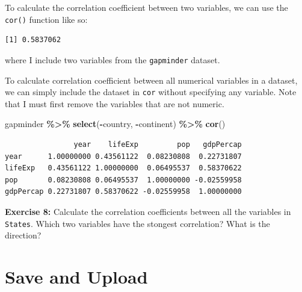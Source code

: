 \documentclass[
]{book}
\makeatletter
\newenvironment{Shaded}{\begin{snugshade}}{\end{snugshade}}
\newcommand{\FunctionTok}[1]{\textcolor[rgb]{0.27,0.27,0.27}{\textbf{#1}}}
\newcommand{\NormalTok}[1]{#1}
\newcommand{\SpecialCharTok}[1]{\textcolor[rgb]{0.43,0.43,0.43}{\textbf{#1}}}
\newenvironment{kframe}{%
\medskip{}
\setlength{\fboxsep}{.8em}
 \def\at@end@of@kframe{}%
 \ifinner\ifhmode%
  \def\at@end@of@kframe{\end{minipage}}%
  \begin{minipage}{\columnwidth}%
 \fi\fi%
 \def\FrameCommand##1{\hskip\@totalleftmargin \hskip-\fboxsep
 \colorbox{shadecolor}{##1}\hskip-\fboxsep
     \hskip-\linewidth \hskip-\@totalleftmargin \hskip\columnwidth}%
 \MakeFramed {\advance\hsize-\width
   \@totalleftmargin\z@ \linewidth\hsize
   \@setminipage}}%
 {\par\unskip\endMakeFramed%
 \at@end@of@kframe}
\renewenvironment{Shaded}{\begin{kframe}}{\end{kframe}}
\newenvironment{rmdblock}[1]
  {\begin{shaded*}
  }
  {\end{shaded*}
  }
\newenvironment{learncheck}
  {\begin{rmdblock}{warning}}
  {\end{rmdblock}}
\makeatother
\begin{document}
To calculate the correlation coefficient between two variables, we can use the \texttt{cor()} function like so:

\begin{Shaded}
\end{Shaded}

\begin{verbatim}
[1] 0.5837062
\end{verbatim}

where I include two variables from the \texttt{gapminder} dataset.

To calculate correlation coefficient between all numerical variables in a dataset, we can simply include the dataset in \texttt{cor} without specifying any variable. Note that I must first remove the variables that are not numeric.

\begin{Shaded}
\begin{Highlighting}[]
\NormalTok{gapminder }\SpecialCharTok{\%\textgreater{}\%} 
  \FunctionTok{select}\NormalTok{(}\SpecialCharTok{{-}}\NormalTok{country, }\SpecialCharTok{{-}}\NormalTok{continent) }\SpecialCharTok{\%\textgreater{}\%} 
  \FunctionTok{cor}\NormalTok{()}
\end{Highlighting}
\end{Shaded}

\begin{verbatim}
                year    lifeExp         pop   gdpPercap
year      1.00000000 0.43561122  0.08230808  0.22731807
lifeExp   0.43561122 1.00000000  0.06495537  0.58370622
pop       0.08230808 0.06495537  1.00000000 -0.02559958
gdpPercap 0.22731807 0.58370622 -0.02559958  1.00000000
\end{verbatim}

\begin{learncheck}
\textbf{Exercise 8:} Calculate the correlation coefficients between all
the variables in \texttt{States}. Which two variables have the stongest
correlation? What is the direction?
\end{learncheck}

\hypertarget{save-and-upload-3}{%
\section{Save and Upload}\label{save-and-upload-3}}
\end{document}
